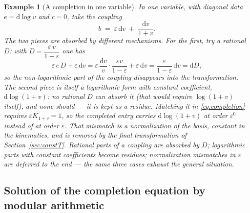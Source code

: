 \documentclass[11pt]{article}
\newcommand{\eps}{\varepsilon}
\newcommand{\dd}{\mathrm{d}}
\newtheorem{example}[definition]{Example}
\begin{document}
\begin{example}[A completion in one variable]
\label{ex:completion}
In one variable, with diagonal data $e = \dd\log v$ and $c = 0$,
take the coupling
\begin{equation}
  b \;=\; \eps\,\dd v \;+\; \frac{\dd v}{1+v} .
\end{equation}
The two pieces are absorbed by different mechanisms.  For the first,
try a rational $D$: with $D = \dfrac{\eps\, v}{1-\eps}$ one has
\begin{equation}
  \eps\, e\, D + \eps\,\dd v
  = \eps\,\frac{\dd v}{v}\cdot\frac{\eps v}{1-\eps} + \eps\,\dd v
  = \frac{\eps}{1-\eps}\,\dd v
  = \dd D ,
\end{equation}
so the non-logarithmic part of the coupling disappears into the
transformation.  The second piece is itself a logarithmic form with
constant coefficient, $\dd\log(1+v)$: no rational $D$ can absorb it
(that would require $\log(1+v)$ itself), and none should --- it is
kept as a residue.  Matching it in \eqref{eq:completion} requires
$\eps K_{1+v} = 1$, so the completed entry carries
$\dd\log(1+v)$ at order $\eps^0$ instead of at order $\eps$.  That
mismatch is a normalization of the basis, constant in the kinematics,
and is removed by the final transformation of
Section~\ref{sec:constT}.  Rational parts of a coupling are absorbed
by $D$; logarithmic parts with constant coefficients become
residues; normalization mismatches in $\eps$ are deferred to the
end --- the same three cases exhaust the general situation.
\end{example}

\subsection{Solution of the completion equation by modular
arithmetic}
\label{sec:modular}
\end{document}
